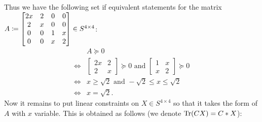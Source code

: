 Thus we have the following set if equivalent statements for the matrix $A\coloneqq 
\begin{bmatrix}2x&2 &0 &0\\
2&x&0 &0\\
0&0&1&x\\
0&0&x&2
\end{bmatrix}\in S^{4\times 4}$:
\begin{align*}
&A\succeq 0\\
\iff& \begin{bmatrix}2x&2\\2&x\end{bmatrix}\succeq 0 \text{ and } \begin{bmatrix}1&x\\x&2\end{bmatrix}\succeq 0\\
\iff& x\ge \sqrt 2 \text{ and } -\sqrt 2\le x\le \sqrt 2\\
\iff& x=\sqrt2.
\end{align*}
Now it remains to put linear constraints on $X\in S^{4\times 4}$ so that it takes the form of $A$ with $x$ variable. This is obtained as follows (we denote $\operatorname{Tr}(CX) = C*X$):
